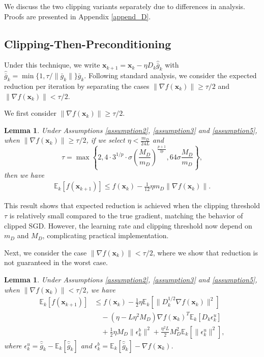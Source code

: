 \documentclass{article}
\newcommand{\bx}{\boldsymbol{x}}
\newcommand{\barg}{\bar{g}}
\theoremstyle{plain}
\newtheorem{lemma}[theorem]{Lemma}
\theoremstyle{definition}
\theoremstyle{remark}
\begin{document}
We discuss the two clipping variants separately due to differences in analysis. Proofs are presented in Appendix \ref{append_D}.

\subsection{Clipping-Then-Preconditioning}\label{subsec:clipping1}

Under this technique, we write $\bx_{k+1} = \bx_k -\eta D_k \widehat{\barg}_k$ with $\widehat{\barg}_k = \min\{1, \tau/\|\barg_k\|\}\barg_k$. Following standard analysis, we consider the expected reduction per iteration by separating the cases $\|\nabla f(\bx_k)\| \geq \tau/2$ and $\|\nabla f(\bx_k)\| < \tau/2$.

We first consider $\|\nabla f(\bx_k)\| \geq \tau/2$.
\begin{lemma}\label{lemma42}
    Under Assumptions \ref{assumption2}, \ref{assumption3} and \ref{assumption5}, when $\|\nabla f(\bx_k)\|\geq \tau/2$, if we select $\eta<\frac{m_D}{24L}$ and 
    \begin{equation*}
        \tau = \max\left\{2,  4\cdot 3^{1/p}\cdot \sigma\left(\frac{M_D}{m_D}\right)^{\frac{p+1}{2p}}, 64 \sigma \frac{M_D}{m_D}\right\},
    \end{equation*}
    then
    we have
    \begin{align*}
    \mathbb{E}_k[ f(\bx_{k+1}) ] \le f(\bx_k) - \frac{1}{12} \eta m_D \|\nabla f(\bx_k)\|.
\end{align*}
\end{lemma}
This result shows that expected reduction is achieved when the clipping threshold $\tau$ is relatively small compared to the true gradient, matching the behavior of clipped SGD. However, the learning rate and clipping threshold now depend on $m_D$ and $M_D$, complicating practical implementation.

Next, we consider the case $\|\nabla f(\bx_k)\| < \tau/2$, where we show that reduction is not guaranteed in the worst case. 
\begin{lemma}\label{lemma:large_clip}
     Under Assumptions \ref{assumption2}, \ref{assumption3} and \ref{assumption5}, when $\|\nabla f(\bx_k)\| < \tau/2$, we have
    \begin{align*}
    \mathbb{E}_k[ f(\bx_{k+1}) ] & \le f(\bx_k) - \frac{1}{2} \eta \mathbb{E}_k[ \| D_k^{1/2}\nabla f(\bx_k)\|^2 ] \\
    & \quad - (\eta - L\eta^2 M_D) \nabla f(\bx_k)^T \mathbb{E}_k[ D_k \epsilon_k^u] \\
    & \quad + \frac{1}{2}\eta M_D  \|\epsilon_k^b\|^2   + \frac{\eta^2 L}{2} M_D^2 \mathbb{E}_k[ \|\epsilon_k^u\|^2],
\end{align*}
where $\epsilon_k^u=\widehat{\barg}_k-\mathbb{E}_k[\widehat{\barg}_k]$ and $\epsilon_k^b=\mathbb{E}_k[\widehat{\barg}_k]-\nabla f(\bx_k)$.
\end{lemma}
\end{document}
